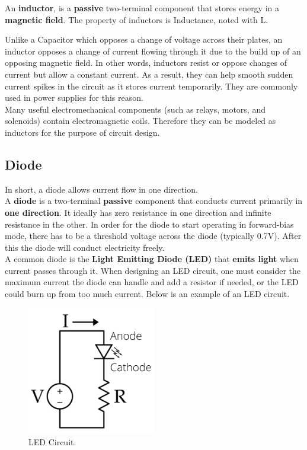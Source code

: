 \documentclass{article}
\begin{document}
An \textbf{inductor}, is a \textbf{passive} two-terminal component that stores energy in a \textbf{magnetic field}. The property of inductors is Inductance,
noted with L.

Unlike a Capacitor which opposes a change of voltage across their plates, an inductor opposes a change of current flowing through 
it due to the build up of an opposing magnetic field. In other words, inductors resist or oppose changes of current but allow a constant current.
As a result, they can help smooth sudden current spikes in the circuit as it stores current temporarily. They are commonly used in power supplies for this reason. \\

Many useful electromechanical components (such as relays, motors, and solenoids) contain electromagnetic coils. Therefore they can be modeled as inductors for 
the purpose of circuit design.

\subsection{Diode}

In short, a diode allows current flow in one direction.\\

A \textbf{diode} is a two-terminal \textbf{passive} component that conducts current primarily in \textbf{one direction}. It ideally has zero resistance in one direction and infinite resistance in the other. In order for the diode to start operating in forward-bias mode, there has to be a threshold voltage across the diode (typically 0.7V). After this the diode will conduct electricity freely. \\

A common diode is the \textbf{Light Emitting Diode (LED)} that \textbf{emits light} when current passes through it. When designing an LED circuit, one must consider the maximum current the diode can handle and add a resistor if needed, or the LED could burn up from too much current. Below is an example of an LED circuit.

\begin{figure} [h]
    \centering
    \includegraphics[width=0.5\textwidth]{img/LED_Circuit.png}
    \caption{LED Circuit.}
    \label{fig:LED_ckt}
\end{figure}
\end{document}

